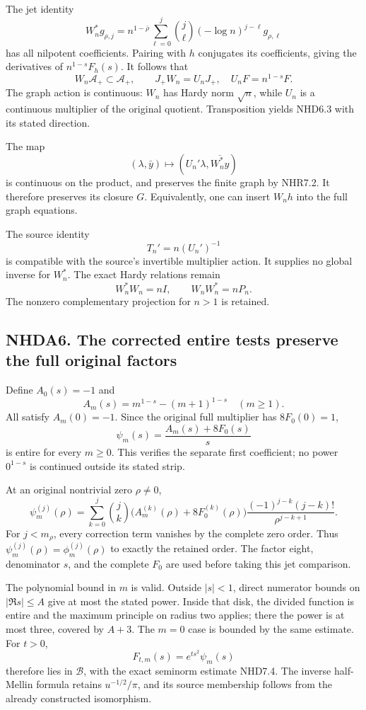 The jet identity \[
W_n^*g_{\rho,j}=
n^{1-\overline\rho}\sum_{\ell=0}^j
\binom j\ell(-\log n)^{j-\ell}g_{\rho,\ell}
\] has all nilpotent coefficients. Pairing with \(h\) conjugates its
coefficients, giving the derivatives of \(n^{1-s}F_h(s)\). It follows
that \[
W_n\mathscr A_+\subset\mathscr A_+,
\qquad
J_+W_n=U_nJ_+,
\quad U_nF=n^{1-s}F.
\] The graph action is continuous: \(W_n\) has Hardy norm \(\sqrt n\),
while \(U_n\) is a continuous multiplier of the original quotient.
Transposition yields NHD6.3 with its stated direction.

The map \[
(\lambda,\bar y)\mapsto
(U_n'\lambda,\overline{W_n^*y})
\] is continuous on the product, and preserves the finite graph by
NHR7.2. It therefore preserves its closure \(G\). Equivalently, one can
insert \(W_nh\) into the full graph equations.

The source identity \[
T_n'=n(U_n')^{-1}
\] is compatible with the source's invertible multiplier action. It
supplies no global inverse for \(W_n^*\). The exact Hardy relations
remain \[
W_n^*W_n=nI,\qquad W_nW_n^*=nP_n.
\] The nonzero complementary projection for \(n>1\) is retained.

\subsection{NHDA6. The corrected entire tests preserve the full original
factors}\label{nhda6.-the-corrected-entire-tests-preserve-the-full-original-factors}

Define \(A_0(s)=-1\) and \[
A_m(s)=m^{1-s}-(m+1)^{1-s}\quad(m\ge1).
\] All satisfy \(A_m(0)=-1\). Since the original full multiplier has
\(8F_0(0)=1\), \[
\psi_m(s)=\frac{A_m(s)+8F_0(s)}s
\] is entire for every \(m\ge0\). This verifies the separate first
coefficient; no power \(0^{1-s}\) is continued outside its stated strip.

At an original nontrivial zero \(\rho\ne0\), \[
\psi_m^{(j)}(\rho)=
\sum_{k=0}^{j}\binom jk
\bigl(A_m^{(k)}(\rho)+8F_0^{(k)}(\rho)\bigr)
\frac{(-1)^{j-k}(j-k)!}{\rho^{j-k+1}}.
\] For \(j<m_\rho\), every correction term vanishes by the complete zero
order. Thus \(\psi_m^{(j)}(\rho)=\phi_m^{(j)}(\rho)\) to exactly the
retained order. The factor eight, denominator \(s\), and the complete
\(F_0\) are used before taking this jet comparison.

The polynomial bound in \(m\) is valid. Outside \(|s|<1\), direct
numerator bounds on \(|\Re s|\le A\) give at most the stated power.
Inside that disk, the divided function is entire and the maximum
principle on radius two applies; there the power is at most three,
covered by \(A+3\). The \(m=0\) case is bounded by the same estimate.
For \(t>0\), \[
F_{t,m}(s)=e^{ts^2}\psi_m(s)
\] therefore lies in \(\mathcal B\), with the exact seminorm estimate
NHD7.4. The inverse half-Mellin formula retains \(u^{-1/2}/\pi\), and
its source membership follows from the already constructed isomorphism.

